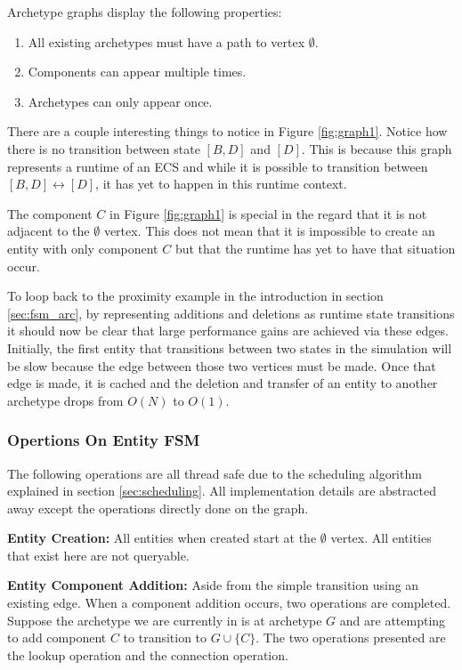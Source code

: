 Archetype graphs display the following properties:

\begin{enumerate}
    \item All existing archetypes must have a path to vertex $\emptyset$.
    \item Components can appear multiple times.
    \item Archetypes can only appear once.
\end{enumerate}

There are a couple interesting things to notice in Figure \ref{fig:graph1}. Notice how there is no transition between state $[B,D]$ and $[D]$. This is because this graph represents a runtime of an ECS and while it is possible to transition between $[B,D] \leftrightarrow [D]$, it has yet to happen in this runtime context. 

The component $C$ in Figure \ref{fig:graph1} is special in the regard that it is not adjacent to the $\emptyset$ vertex. This does not mean that it is impossible to create an entity with only component $C$ but that the runtime has yet to have that situation occur.

To loop back to the proximity example in the introduction in section \ref{sec:fsm_arc}, by representing additions and deletions as runtime state transitions it should now be clear that large performance gains are achieved via these edges. Initially, the first entity that transitions between two states in the simulation will be slow because the edge between those two vertices must be made. Once that edge is made, it is cached and the deletion and transfer of an entity to another archetype drops from $O(N)$ to $O(1)$.

\subsubsection{Opertions On Entity FSM}
The following operations are all thread safe due to the scheduling algorithm explained in section \ref{sec:scheduling}. All implementation details are abstracted away except the operations directly done on the graph. 

\textbf{Entity Creation:} All entities when created start at the $\emptyset$ vertex. All entities that exist here are not queryable.

\textbf{Entity Component Addition: } Aside from the simple transition using an existing edge. When a component addition occurs, two operations are completed. Suppose the archetype we are currently in is at archetype $G$ and are attempting to add component $C$ to transition to $G \cup \{C\}$. The two operations presented are the lookup operation and the connection operation.

